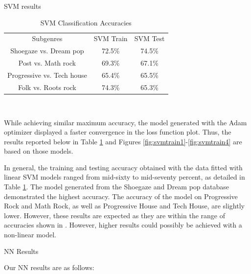 \documentclass[letterpaper, 12 pt, conference]{ieeeconf}  %
\begin{document}

\par SVM results 

\begin{table}[!ht]
    \begin{center}
    \caption{SVM Classification Accuracies}{\label{tab:svm_acc}}
    \begin{tabular}{ |c|c|c| }
     Subgenres & SVM Train & SVM Test \\ 
     Shoegaze vs. Dream pop & 72.5\% & 74.5\% \\
     Post vs. Math rock & 69.3\% & 67.1\% \\
     Progressive vs. Tech house & 65.4\% & 65.5\% \\
     Folk vs. Roots rock & 74.3\% & 65.3\% \\
    \end{tabular}\\
    \end{center}
\end{table}
\par While achieving similar maximum accuracy, the model generated with the Adam optimizer displayed a faster convergence in the loss function plot. Thus, the results reported below in Table \ref{tab:svm_acc} and Figures \ref{fig:svmtrain1}-\ref{fig:svmtrain4} are based on those models.




\par In general, the training and testing accuracy obtained with the data fitted with linear SVM models ranged from mid-sixty to mid-seventy percent, as detailed in Table \ref{tab:svm_acc}. The model generated from the Shoegaze and Dream pop database demonstrated the highest accuracy. The accuracy of the model on Progressive Rock and Math Rock, as well as Progressive House and Tech House, are slightly lower. However, these results are expected as they are within the range of accuracies shown in \cite{c7}. However, higher results could possibly be achieved with a non-linear model. \newline

\par NN Results 
\vspace{\medskipamount}
\par Our NN results are as follows:
\end{document}
